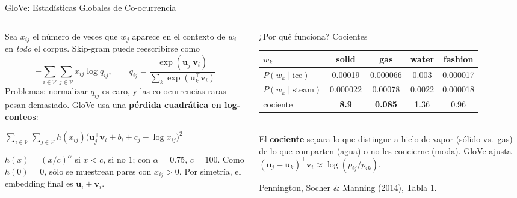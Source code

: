 \documentclass[aspectratio=169, 10pt]{beamer}
\newcommand{\V}{\mathcal{V}}
\newcommand{\formula}[1]{%
	\begin{tcolorbox}[colback=UCMBlue!8, colframe=UCMBlue, arc=4pt,
		boxsep=2pt, left=6pt, right=6pt, top=3pt, bottom=3pt]
		#1
	\end{tcolorbox}
}
\begin{document}
\begin{frame}{GloVe: Estad\'isticas Globales de Co-ocurrencia}

	\begin{columns}[T]
		\begin{column}{0.52\textwidth}
			\small
			Sea $x_{ij}$ el n\'umero de veces que $w_j$ aparece en el contexto de $w_i$ en \emph{todo} el corpus. Skip-gram puede reescribirse como
			\[
				-\sum_{i\in\V}\sum_{j\in\V} x_{ij}\log q_{ij}, \qquad q_{ij} = \frac{\exp(\mathbf{u}_j^\top\mathbf{v}_i)}{\sum_{k}\exp(\mathbf{u}_k^\top\mathbf{v}_i)}
			\]
			Problemas: normalizar $q_{ij}$ es caro, y las co-ocurrencias raras pesan demasiado. GloVe usa una \textbf{p\'erdida cuadr\'atica en log-conteos}:
			\formula{\small $\displaystyle\sum_{i\in\V}\sum_{j\in\V} h(x_{ij})\big(\mathbf{u}_j^\top\mathbf{v}_i + b_i + c_j - \log x_{ij}\big)^2$}
			\scriptsize
			$h(x) = (x/c)^{\alpha}$ si $x<c$, si no $1$; con $\alpha=0.75$, $c=100$. Como $h(0)=0$, s\'olo se muestrean pares con $x_{ij}>0$. Por simetr\'ia, el embedding final es $\mathbf{u}_i + \mathbf{v}_i$.
		\end{column}

		\begin{column}{0.45\textwidth}
			\begin{block}{¿Por qu\'e funciona? Cocientes}
				\scriptsize
				\setlength{\tabcolsep}{3pt}
				\begin{tabular}{@{}lcccc@{}}
					\toprule
					$w_k$ & solid & gas & water & fashion \\
					\midrule
					$P(w_k\mid\text{ice})$ & 0.00019 & 0.000066 & 0.003 & 0.000017 \\
					$P(w_k\mid\text{steam})$ & 0.000022 & 0.00078 & 0.0022 & 0.000018 \\
					\midrule
					cociente & \textbf{8.9} & \textbf{0.085} & 1.36 & 0.96 \\
					\bottomrule
				\end{tabular}
				\\[4pt]
				\small
				El \textbf{cociente} separa lo que distingue a hielo de vapor (s\'olido vs.\ gas) de lo que comparten (agua) o no les concierne (moda). GloVe ajusta
				$(\mathbf{u}_j-\mathbf{u}_k)^\top\mathbf{v}_i \approx \log(p_{ij}/p_{ik})$.
			\end{block}
			{\tiny Pennington, Socher \& Manning (2014), Tabla 1.}
		\end{column}
	\end{columns}

\end{frame}
\end{document}
